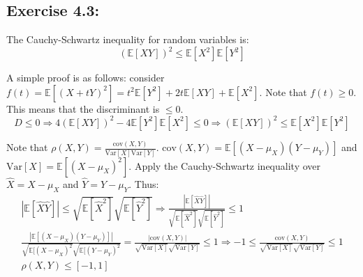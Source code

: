 \documentclass{article}
\begin{document}
\subsection*{Exercise 4.3:}
\begin{flushleft}
The Cauchy-Schwartz inequality for random variables is:
\begin{equation}
(\mathbb{E}[XY])^{2} \leq \mathbb{E}[X^2] \mathbb{E}[Y^2]
\end{equation}

A simple proof is as follows: consider \(f(t) = \mathbb{E}[(X + tY)^2] = t^2\mathbb{E}[Y^2] + 2t\mathbb{E}[XY] + \mathbb{E}[X^2]\). Note that \(f(t) \geq 0\). This means that the discriminant is \(\leq 0\). 
\begin{equation}
D \leq 0 \Rightarrow 4(\mathbb{E}[XY])^2 - 4\mathbb{E}[Y^2]\mathbb{E}[X^2] \leq 0 \Rightarrow (\mathbb{E}[XY])^2 \leq \mathbb{E}[X^2] \mathbb{E}[Y^2]
\end{equation}

Note that \(\rho(X, Y) = \frac{\mathrm{cov}(X, Y)}{\mathrm{Var}[X]\mathrm{Var}[Y]}\). \(\mathrm{cov}(X, Y) = \mathbb{E}[(X - \mu_{X})(Y - \mu_{Y})]\) and \(\mathrm{Var}[X] = \mathbb{E}[(X - \mu_{X})^2]\). Apply the Cauchy-Schwartz inequality over \(\hat{X} = X - \mu_{X}\) and \(\hat{Y} = Y - \mu_{Y}\). Thus:
\begin{gather}
|\mathbb{E}[\hat{X}\hat{Y}]| \leq \sqrt{\mathbb{E}[\hat{X}^2]}\sqrt{\mathbb{E}[\hat{Y}^2]} \Rightarrow \frac{|\mathbb{E}[\hat{X}\hat{Y}]|}{\sqrt{\mathbb{E}[\hat{X}^2]}\sqrt{\mathbb{E}[\hat{Y}^2]}} \leq 1 \\
\frac{|\mathbb{E}[(X - \mu_{X})(Y - \mu_{Y})]|}{\sqrt{\mathbb{E}[(X - \mu_{X})^2}\sqrt{\mathbb{E}[(Y - \mu_{Y})^2}} = \frac{|\mathrm{cov}(X, Y)|}{\sqrt{\mathrm{Var}[X]}\sqrt{\mathrm{Var}[Y]}} \leq 1 \Rightarrow -1 \leq \frac{\mathrm{cov}(X, Y)}{\sqrt{\mathrm{Var}[X]}\sqrt{\mathrm{Var}[Y]}} \leq 1 \\
\rho(X, Y) \leq [-1, 1]
\end{gather}
\end{flushleft}
\end{document}
